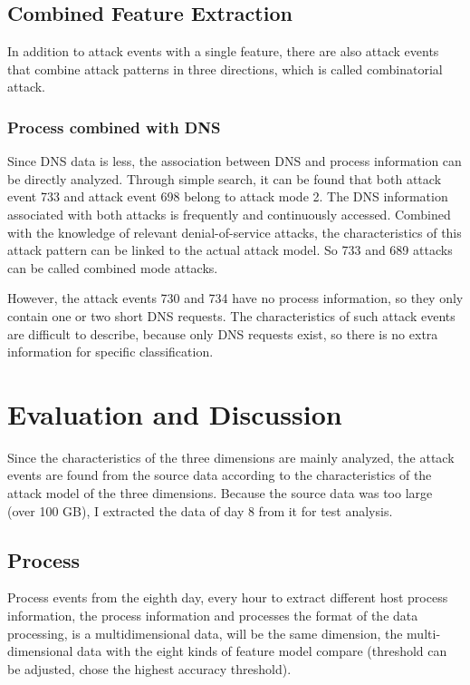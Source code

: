 \documentclass[12pt,journal,draftcls,doublespace, letterpaper,onecolumn]{IEEEtran}
\begin{document}
\subsection{Combined Feature Extraction}
In addition to attack events with a single feature, there are also attack events that combine attack patterns in three directions, which is called combinatorial attack.

\subsubsection{Process combined with DNS}
Since DNS data is less, the association between DNS and process information can be directly analyzed. Through simple search, it can be found that both attack event 733 and attack event 698 belong to attack mode 2. The DNS information associated with both attacks is frequently and continuously accessed. Combined with the knowledge of relevant denial-of-service attacks, the characteristics of this attack pattern can be linked to the actual attack model. So 733 and 689 attacks can be called combined mode attacks.

However, the attack events 730 and 734 have no process information, so they only contain one or two short DNS requests. The characteristics of such attack events are difficult to describe, because only DNS requests exist, so there is no extra information for specific classification.


\section{Evaluation and Discussion}
Since the characteristics of the three dimensions are mainly analyzed, the attack events are found from the source data according to the characteristics of the attack model of the three dimensions. Because the source data was too large (over 100 GB), I extracted the data of day 8 from it for test analysis.

\subsection{Process}
Process events from the eighth day, every hour to extract different host process information, the process information and processes the format of the data processing, is a multidimensional data, will be the same dimension, the multi-dimensional data with the eight kinds of feature model compare (threshold can be adjusted, chose the highest accuracy threshold).
\end{document}
